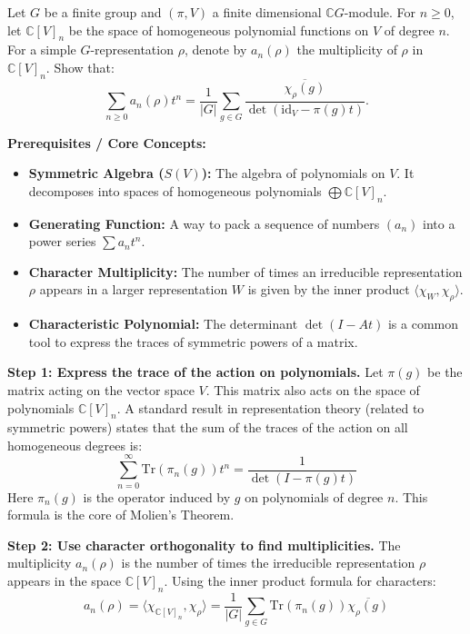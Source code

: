 \begin{exercise}
\label{algebra:2015:9}
Let $G$ be a finite group and $(\pi, V)$ a finite dimensional $\mathbb{C}G$-module. For $n \geq 0$, let $\mathbb{C}[V]_n$ be the space of homogeneous polynomial functions on $V$ of degree $n$. For a simple $G$-representation $\rho$, denote by $a_n(\rho)$ the multiplicity of $\rho$ in $\mathbb{C}[V]_n$. Show that:
\[ \sum_{n \geq 0} a_n(\rho) t^n = \frac{1}{|G|} \sum_{g \in G} \frac{\overline{\chi_\rho(g)}}{\det(\mathrm{id}_V - \pi(g) t)}. \]
\end{exercise}

\begin{solution}
\textbf{Prerequisites / Core Concepts:}
\begin{itemize}
    \item \textbf{Symmetric Algebra ($S(V)$):} The algebra of polynomials on $V$. It decomposes into spaces of homogeneous polynomials $\bigoplus \mathbb{C}[V]_n$.
    \item \textbf{Generating Function:} A way to pack a sequence of numbers $(a_n)$ into a power series $\sum a_n t^n$.
    \item \textbf{Character Multiplicity:} The number of times an irreducible representation $\rho$ appears in a larger representation $W$ is given by the inner product $\langle \chi_W, \chi_\rho \rangle$.
    \item \textbf{Characteristic Polynomial:} The determinant $\det(I - At)$ is a common tool to express the traces of symmetric powers of a matrix.
\end{itemize}

\textbf{Step 1: Express the trace of the action on polynomials.}
Let $\pi(g)$ be the matrix acting on the vector space $V$. This matrix also acts on the space of polynomials $\mathbb{C}[V]_n$.
A standard result in representation theory (related to symmetric powers) states that the sum of the traces of the action on all homogeneous degrees is:
\[ \sum_{n=0}^\infty \text{Tr}(\pi_n(g)) t^n = \frac{1}{\det(I - \pi(g) t)} \]
Here $\pi_n(g)$ is the operator induced by $g$ on polynomials of degree $n$. This formula is the core of Molien's Theorem.

\textbf{Step 2: Use character orthogonality to find multiplicities.}
The multiplicity $a_n(\rho)$ is the number of times the irreducible representation $\rho$ appears in the space $\mathbb{C}[V]_n$.
Using the inner product formula for characters:
\[ a_n(\rho) = \langle \chi_{\mathbb{C}[V]_n}, \chi_\rho \rangle = \frac{1}{|G|} \sum_{g \in G} \text{Tr}(\pi_n(g)) \overline{\chi_\rho(g)} \]


\end{solution}
